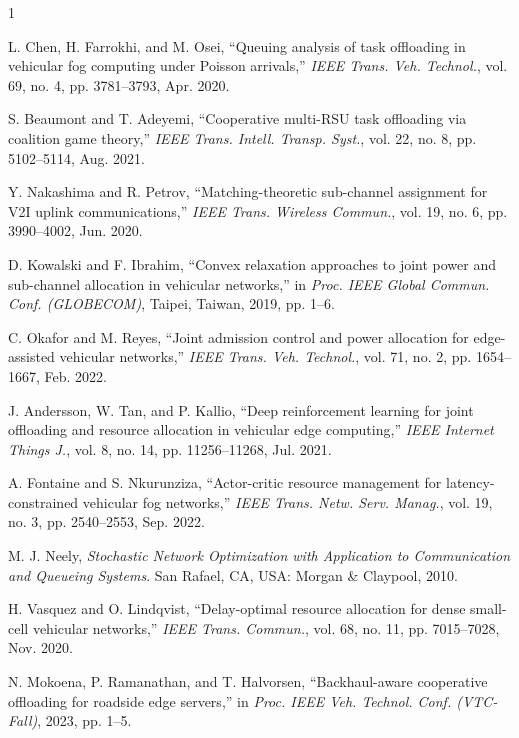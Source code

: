 \documentclass[journal,10pt]{IEEEtran}
\begin{document}
\begin{thebibliography}{1}

L. Chen, H. Farrokhi, and M. Osei, ``Queuing analysis of task offloading in vehicular fog computing under Poisson arrivals,'' \textit{IEEE Trans. Veh. Technol.}, vol. 69, no. 4, pp. 3781--3793, Apr. 2020.

S. Beaumont and T. Adeyemi, ``Cooperative multi-RSU task offloading via coalition game theory,'' \textit{IEEE Trans. Intell. Transp. Syst.}, vol. 22, no. 8, pp. 5102--5114, Aug. 2021.

Y. Nakashima and R. Petrov, ``Matching-theoretic sub-channel assignment for V2I uplink communications,'' \textit{IEEE Trans. Wireless Commun.}, vol. 19, no. 6, pp. 3990--4002, Jun. 2020.

D. Kowalski and F. Ibrahim, ``Convex relaxation approaches to joint power and sub-channel allocation in vehicular networks,'' in \textit{Proc. IEEE Global Commun. Conf. (GLOBECOM)}, Taipei, Taiwan, 2019, pp. 1--6.

C. Okafor and M. Reyes, ``Joint admission control and power allocation for edge-assisted vehicular networks,'' \textit{IEEE Trans. Veh. Technol.}, vol. 71, no. 2, pp. 1654--1667, Feb. 2022.

J. Andersson, W. Tan, and P. Kallio, ``Deep reinforcement learning for joint offloading and resource allocation in vehicular edge computing,'' \textit{IEEE Internet Things J.}, vol. 8, no. 14, pp. 11256--11268, Jul. 2021.

A. Fontaine and S. Nkurunziza, ``Actor-critic resource management for latency-constrained vehicular fog networks,'' \textit{IEEE Trans. Netw. Serv. Manag.}, vol. 19, no. 3, pp. 2540--2553, Sep. 2022.

M. J. Neely, \textit{Stochastic Network Optimization with Application to Communication and Queueing Systems}. San Rafael, CA, USA: Morgan \& Claypool, 2010.

H. Vasquez and O. Lindqvist, ``Delay-optimal resource allocation for dense small-cell vehicular networks,'' \textit{IEEE Trans. Commun.}, vol. 68, no. 11, pp. 7015--7028, Nov. 2020.

N. Mokoena, P. Ramanathan, and T. Halvorsen, ``Backhaul-aware cooperative offloading for roadside edge servers,'' in \textit{Proc. IEEE Veh. Technol. Conf. (VTC-Fall)}, 2023, pp. 1--5.

\end{thebibliography}
\end{document}
